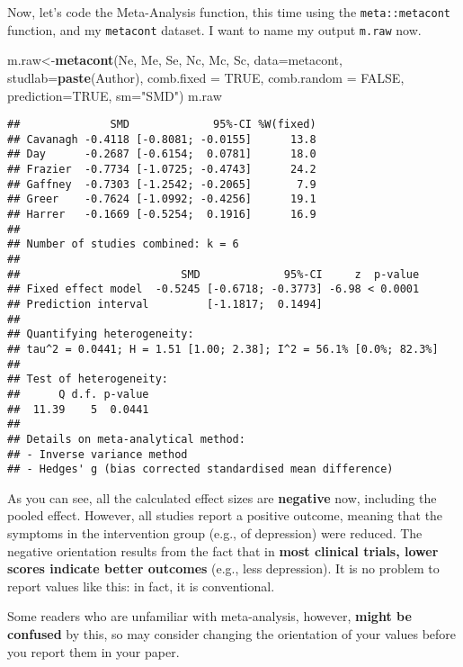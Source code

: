 \documentclass[]{book}
\newenvironment{Shaded}{\begin{snugshade}}{\end{snugshade}}
\newcommand{\KeywordTok}[1]{\textcolor[rgb]{0.13,0.29,0.53}{\textbf{#1}}}
\newcommand{\DataTypeTok}[1]{\textcolor[rgb]{0.13,0.29,0.53}{#1}}
\newcommand{\StringTok}[1]{\textcolor[rgb]{0.31,0.60,0.02}{#1}}
\newcommand{\OtherTok}[1]{\textcolor[rgb]{0.56,0.35,0.01}{#1}}
\newcommand{\NormalTok}[1]{#1}
\theoremstyle{definition}
\theoremstyle{definition}
\theoremstyle{definition}
\theoremstyle{remark}
\begin{document}
Now, let's code the Meta-Analysis function, this time using the
\texttt{meta::metacont} function, and my \texttt{metacont} dataset. I
want to name my output \texttt{m.raw} now.

\begin{Shaded}
\begin{Highlighting}[]
\NormalTok{m.raw<-}\KeywordTok{metacont}\NormalTok{(Ne,}
\NormalTok{                Me,}
\NormalTok{                Se,}
\NormalTok{                Nc,}
\NormalTok{                Mc,}
\NormalTok{                Sc,}
                \DataTypeTok{data=}\NormalTok{metacont,}
                \DataTypeTok{studlab=}\KeywordTok{paste}\NormalTok{(Author),}
                \DataTypeTok{comb.fixed =} \OtherTok{TRUE}\NormalTok{,}
                \DataTypeTok{comb.random =} \OtherTok{FALSE}\NormalTok{,}
                \DataTypeTok{prediction=}\OtherTok{TRUE}\NormalTok{,}
                \DataTypeTok{sm=}\StringTok{"SMD"}\NormalTok{)}
\NormalTok{m.raw}
\end{Highlighting}
\end{Shaded}

\begin{verbatim}
##              SMD             95%-CI %W(fixed)
## Cavanagh -0.4118 [-0.8081; -0.0155]      13.8
## Day      -0.2687 [-0.6154;  0.0781]      18.0
## Frazier  -0.7734 [-1.0725; -0.4743]      24.2
## Gaffney  -0.7303 [-1.2542; -0.2065]       7.9
## Greer    -0.7624 [-1.0992; -0.4256]      19.1
## Harrer   -0.1669 [-0.5254;  0.1916]      16.9
## 
## Number of studies combined: k = 6
## 
##                         SMD             95%-CI     z  p-value
## Fixed effect model  -0.5245 [-0.6718; -0.3773] -6.98 < 0.0001
## Prediction interval         [-1.1817;  0.1494]               
## 
## Quantifying heterogeneity:
## tau^2 = 0.0441; H = 1.51 [1.00; 2.38]; I^2 = 56.1% [0.0%; 82.3%]
## 
## Test of heterogeneity:
##      Q d.f. p-value
##  11.39    5  0.0441
## 
## Details on meta-analytical method:
## - Inverse variance method
## - Hedges' g (bias corrected standardised mean difference)
\end{verbatim}

\begin{rmdachtung}
As you can see, all the calculated effect sizes are \textbf{negative}
now, including the pooled effect. However, all studies report a positive
outcome, meaning that the symptoms in the intervention group (e.g., of
depression) were reduced. The negative orientation results from the fact
that in \textbf{most clinical trials, lower scores indicate better
outcomes} (e.g., less depression). It is no problem to report values
like this: in fact, it is conventional.

Some readers who are unfamiliar with meta-analysis, however,
\textbf{might be confused} by this, so may consider changing the
orientation of your values before you report them in your paper.
\end{rmdachtung}
\end{document}
